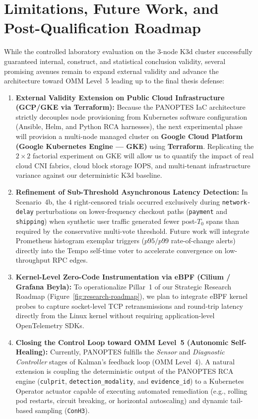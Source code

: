 \section{Limitations, Future Work, and Post-Qualification Roadmap}
\label{sec:future-work}

While the controlled laboratory evaluation on the 3-node K3d cluster successfully guaranteed internal, construct, and statistical conclusion validity, several promising avenues remain to expand external validity and advance the architecture toward OMM Level~5 leading up to the final thesis defense:

\begin{enumerate}
    \item \textbf{External Validity Extension on Public Cloud Infrastructure (GCP/GKE via Terraform):} Because the PANOPTES IaC architecture strictly decouples node provisioning from Kubernetes software configuration (Ansible, Helm, and Python RCA harnesses), the next experimental phase will provision a multi-node managed cluster on \textbf{Google Cloud Platform (Google Kubernetes Engine --- GKE)} using \textbf{Terraform}. Replicating the $2\times2$ factorial experiment on GKE will allow us to quantify the impact of real cloud CNI fabrics, cloud block storage IOPS, and multi-tenant infrastructure variance against our deterministic K3d baseline.
    
    \item \textbf{Refinement of Sub-Threshold Asynchronous Latency Detection:} In Scenario~4b, the $4$ right-censored trials occurred exclusively during \texttt{network-delay} perturbations on lower-frequency checkout paths (\texttt{payment} and \texttt{shipping}) when synthetic user traffic generated fewer post-$T_0$ spans than required by the conservative multi-vote threshold. Future work will integrate Prometheus histogram exemplar triggers ($p95/p99$ rate-of-change alerts) directly into the Tempo self-time voter to accelerate convergence on low-throughput RPC edges.
    
    \item \textbf{Kernel-Level Zero-Code Instrumentation via eBPF (Cilium / Grafana Beyla):} To operationalize Pillar~1 of our Strategic Research Roadmap (Figure~\ref{fig:research-roadmap}), we plan to integrate eBPF kernel probes to capture socket-level TCP retransmissions and round-trip latency directly from the Linux kernel without requiring application-level OpenTelemetry SDKs.
    
    \item \textbf{Closing the Control Loop toward OMM Level~5 (Autonomic Self-Healing):} Currently, PANOPTES fulfills the \textit{Sensor} and \textit{Diagnostic Controller} stages of Kalman's feedback loop (OMM Level~4). A natural extension is coupling the deterministic output of the PANOPTES RCA engine (\texttt{culprit}, \texttt{detection\_modality}, and \texttt{evidence\_id}) to a Kubernetes Operator actuator capable of executing automated remediation (e.g., rolling pod restarts, circuit breaking, or horizontal autoscaling) and dynamic tail-based sampling (\texttt{ConH3}).
\end{enumerate}

